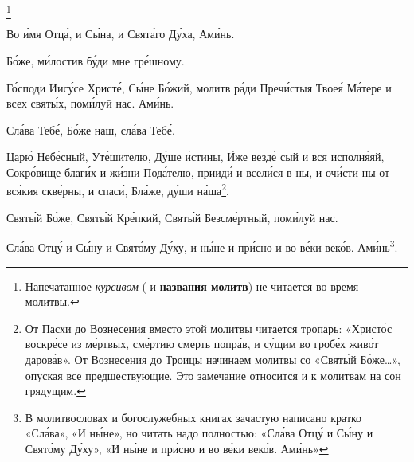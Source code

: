 \begin{mymulticols}


\footnote{Напечатанное \emph{курсивом} ( и \textbf{названия молитв}) не читается во время молитвы.} 

Во \'{и}мя Отц\'{а}, и С\'{ы}на, и Свят\'{а}го Д\'{у}ха, Ам\'{и}нь.

\medskip {}


Б\'{о}же, м\'{и}лостив б\'{у}ди мне гр\'{е}шному. 


Г\'{о}споди Иис\'{у}се Христ\'{е}, С\'{ы}не Б\'{о}жий, молитв р\'{а}ди Преч\'{и}стыя Твое\'{я} М\'{а}тере и всех свят\'{ы}х, пом\'{и}луй нас. Ам\'{и}нь.

Сл\'{а}ва Теб\'{е}, Б\'{о}же наш, сл\'{а}ва Теб\'{е}.


Цар\'{ю} Неб\'{е}сный, Ут\'{е}шителю, Д\'{у}ше \'{и}стины, \'{И}же везд\'{е} сый и вся исполн\'{я}яй, Сокр\'{о}вище благ\'{и}х и ж\'{и}зни Под\'{а}телю, приид\'{и} и всел\'{и}ся в ны, и оч\'{и}сти ны от вс\'{я}кия скв\'{е}рны, и спас\'{и}, Бл\'{а}же, д\'{у}ши н\'{а}ша\footnote{От Пасхи до Вознесения вместо этой молитвы читается тропарь: «Христ\'{о}с воскр\'{е}се из м\'{е}ртвых, см\'{е}ртию смерть попр\'{а}в, и с\'{у}щим во гроб\'{е}х жив\'{о}т даров\'{а}в».  От Вознесения до Троицы начинаем молитвы со «Свят\'{ы}й Б\'{о}же\ldots», опуская все предшествующие.
Это замечание относится и к молитвам на сон грядущим.}.


Свят\'{ы}й Б\'{о}же, Свят\'{ы}й Кр\'{е}пкий, Свят\'{ы}й Безсм\'{е}ртный, пом\'{и}луй нас.  

Сл\'{а}ва Отц\'{у} и С\'{ы}ну и Свят\'{о}му Д\'{у}ху, и н\'{ы}не и пр\'{и}сно и во в\'{е}ки век\'{о}в. Ам\'{и}нь\footnote{В молитвословах и богослужебных книгах зачастую написано кратко «Сл\'{а}ва», «И н\'{ы}не», но читать надо полностью: «Сл\'{а}ва Отц\'{у} и С\'{ы}ну и Свят\'{о}му Д\'{у}ху», «И н\'{ы}не и пр\'{и}сно и во в\'{е}ки век\'{о}в. Ам\'{и}нь»}.


\end{mymulticols}
